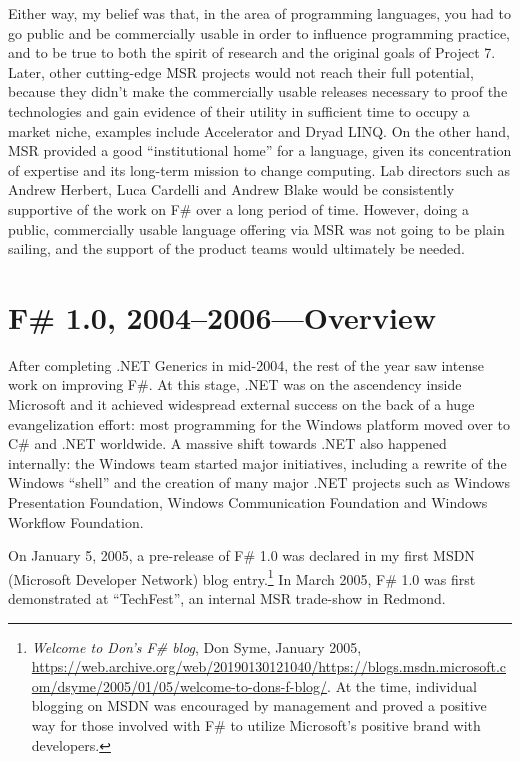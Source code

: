 \documentclass[acmsmall]{acmart}\settopmatter{}
\begin{document}
Either way, my belief was that, in the area of programming languages, you had to go public and be commercially usable in order to influence programming practice, and to be true to both the spirit of research and the original goals of Project 7. Later, other cutting-edge MSR projects would not reach their full potential, because they didn’t make the commercially usable releases necessary to proof the technologies and gain evidence of their utility in sufficient time to occupy a market niche, examples include Accelerator and Dryad LINQ. On the other hand, MSR provided a good “institutional home” for a language, given its concentration of expertise and its long-term mission to change computing. Lab directors such as Andrew Herbert, Luca Cardelli and Andrew Blake would be consistently supportive of the work on F\# over a long period of time. However, doing a public, commercially usable language offering via MSR was not going to be plain sailing, and the support of the product teams would ultimately be needed.

\section*{F\# 1.0, 2004--2006---Overview}

After completing .NET Generics in mid-2004, the rest of the year saw intense work on improving F\#. At this stage, .NET was on the ascendency inside Microsoft and it achieved widespread external success on the back of a huge evangelization effort: most programming for the Windows platform moved over to C\# and .NET worldwide. A massive shift towards .NET also happened internally: the Windows team started major initiatives, including a rewrite of the Windows “shell” and the creation of many major .NET projects such as Windows Presentation Foundation, Windows Communication Foundation and Windows Workflow Foundation.

On January 5, 2005, a pre-release of F\# 1.0 was declared in my first MSDN (Microsoft Developer Network) blog entry.\footnote{\textit{Welcome to Don’s F\# blog}, Don Syme, January 2005, \url{https://web.archive.org/web/20190130121040/https://blogs.msdn.microsoft.com/dsyme/2005/01/05/welcome-to-dons-f-blog/}. At the time, individual blogging on MSDN was encouraged by management and proved a positive way for those involved with F\# to utilize Microsoft’s positive brand with developers.}  In March 2005, F\# 1.0 was first demonstrated at “TechFest”, an internal MSR trade-show in Redmond.  
\end{document}
